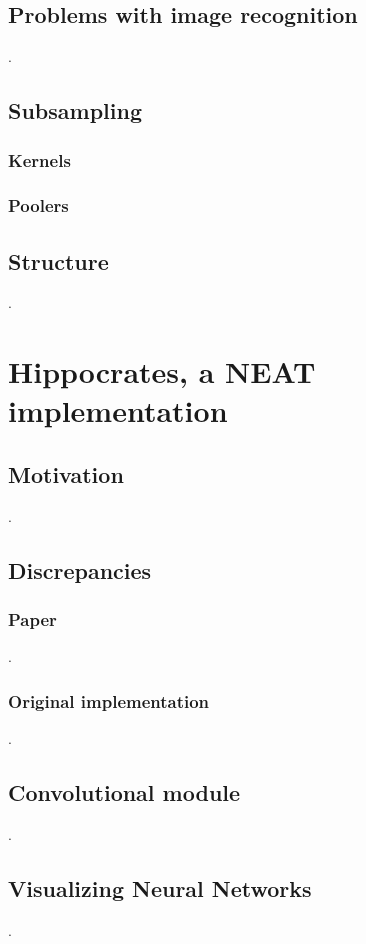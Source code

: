 \documentclass[11pt]{article}
\begin{document}
		\subsection{Problems with image recognition}
			.
		\subsection{Subsampling}
			
			\subsubsection{Kernels}
			
			\subsubsection{Poolers}
			
		\subsection{Structure}
			.
	\newpage

	\section{Hippocrates, a NEAT implementation}
		\subsection{Motivation}
			.
		\subsection{Discrepancies}
			\subsubsection{Paper}
				.
			\subsubsection{Original implementation}
				.
		\subsection{Convolutional module}
			.
		\subsection{Visualizing Neural Networks}
			.
	\newpage
\end{document}
